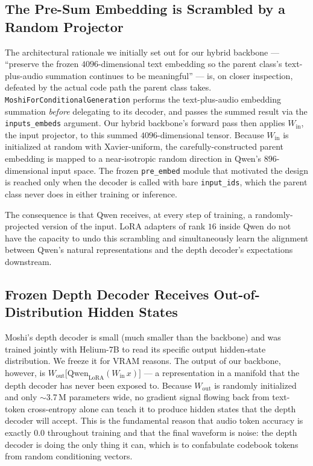 \documentclass[conference]{IEEEtran}
\begin{document}
\subsection{The Pre-Sum Embedding is Scrambled by a Random Projector}

The architectural rationale we initially set out for our hybrid backbone --- ``preserve the frozen $4096$-dimensional text embedding so the parent class's text-plus-audio summation continues to be meaningful'' --- is, on closer inspection, defeated by the actual code path the parent class takes. \texttt{MoshiForConditionalGeneration} performs the text-plus-audio embedding summation \emph{before} delegating to its decoder, and passes the summed result via the \texttt{inputs\_embeds} argument. Our hybrid backbone's forward pass then applies $W_{\text{in}}$, the input projector, to this summed $4096$-dimensional tensor. Because $W_{\text{in}}$ is initialized at random with Xavier-uniform, the carefully-constructed parent embedding is mapped to a near-isotropic random direction in Qwen's $896$-dimensional input space. The frozen \texttt{pre\_embed} module that motivated the design is reached only when the decoder is called with bare \texttt{input\_ids}, which the parent class never does in either training or inference.

The consequence is that Qwen receives, at every step of training, a randomly-projected version of the input. LoRA adapters of rank $16$ inside Qwen do not have the capacity to undo this scrambling and simultaneously learn the alignment between Qwen's natural representations and the depth decoder's expectations downstream.

\subsection{Frozen Depth Decoder Receives Out-of-Distribution Hidden States}

Moshi's depth decoder is small (much smaller than the backbone) and was trained jointly with Helium-7B to read its specific output hidden-state distribution. We freeze it for VRAM reasons. The output of our backbone, however, is $W_{\text{out}}\big[\text{Qwen}_{\text{LoRA}}(W_{\text{in}}\,x)\big]$ --- a representation in a manifold that the depth decoder has never been exposed to. Because $W_{\text{out}}$ is randomly initialized and only $\sim$3.7\,M parameters wide, no gradient signal flowing back from text-token cross-entropy alone can teach it to produce hidden states that the depth decoder will accept. This is the fundamental reason that audio token accuracy is exactly $0.0$ throughout training and that the final waveform is noise: the depth decoder is doing the only thing it can, which is to confabulate codebook tokens from random conditioning vectors.
\end{document}
